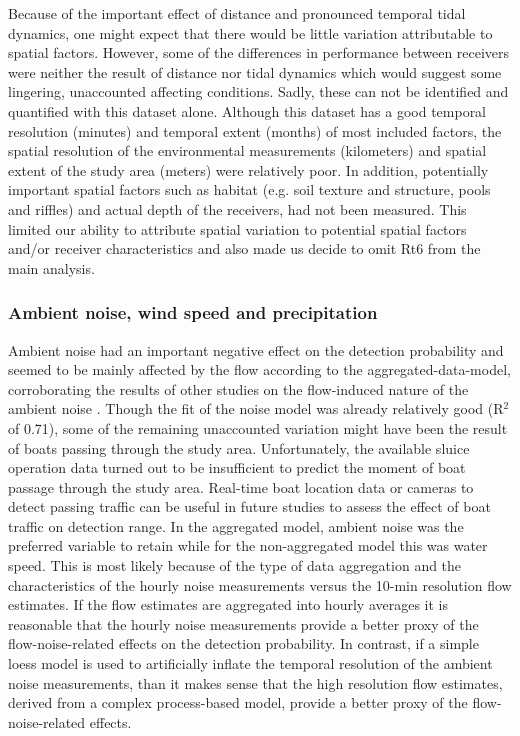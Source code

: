 \documentclass[doublespacing,linenumbers]{bmcart}
\begin{document}
Because of the important effect of distance and pronounced temporal tidal dynamics, one might expect that there would be little variation attributable to spatial factors. However, some of the differences in performance between receivers were neither the result of distance nor tidal dynamics which would suggest some lingering, unaccounted affecting conditions. Sadly, these can not be identified and quantified with this dataset alone. Although this dataset has a good temporal resolution (minutes) and temporal extent (months) of most included factors, the spatial resolution of the environmental measurements (kilometers) and spatial extent of the study area (meters) were relatively poor. In addition, potentially important spatial factors such as habitat \cite{Selby2016CanHabitat} (e.g. soil texture and structure, pools and riffles) and actual depth of the receivers, had not been measured. This limited our ability to attribute spatial variation to potential spatial factors and/or receiver characteristics and also made us decide to omit Rt6 from the main analysis.  

\subsubsection*{Ambient noise, wind speed and precipitation}

Ambient noise had an important negative effect on the detection probability and seemed to be mainly affected by the flow according to the aggregated-data-model, corroborating the results of other studies on the flow-induced nature of the ambient noise \cite{Martin2012MeasurementFundy}. Though the fit of the noise model was already relatively good (R$^{2}$ of 0.71), some of the remaining unaccounted variation might have been the result of boats passing through the study area. Unfortunately, the available sluice operation data turned out to be insufficient to predict the moment of boat passage through the study area. Real-time boat location data or cameras to detect passing traffic can be useful in future studies to assess the effect of boat traffic on detection range. In the aggregated model, ambient noise was the preferred variable to retain while for the non-aggregated model this was water speed. This is most likely because of the type of data aggregation and the characteristics of the hourly noise measurements versus the 10-min resolution flow estimates. If the flow estimates are aggregated into hourly averages it is reasonable that the hourly noise measurements provide a better proxy of the flow-noise-related effects on the detection probability. In contrast, if a simple loess model is used to artificially inflate the temporal resolution of the ambient noise measurements, than it makes sense that the high resolution flow estimates, derived from a complex process-based model, provide a better proxy of the flow-noise-related effects.
\end{document}
